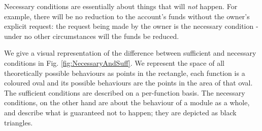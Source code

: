Necessary conditions are essentially about things that will  \emph{not} happen. For example,
there  will be no reduction to the account's funds without the owner's explicit request: the request being made by
the owner is the necessary condition - under no other circumstances will the funds be reduced.

We give a visual representation of the difference between sufficient and necessary conditions in 
Fig. \ref{fig:NecessaryAndSuff}. We
represent the space of all theoretically possible behaviours as points in the rectangle, 
each function is a coloured oval and its possible behaviours are the points in the area of that oval.  
The sufficient conditions are described on a per-function basis. 
The necessary conditions, on the other hand are about the behaviour of a module as a whole, 
and describe what is guaranteed not to happen;
they are depicted as black triangles.

